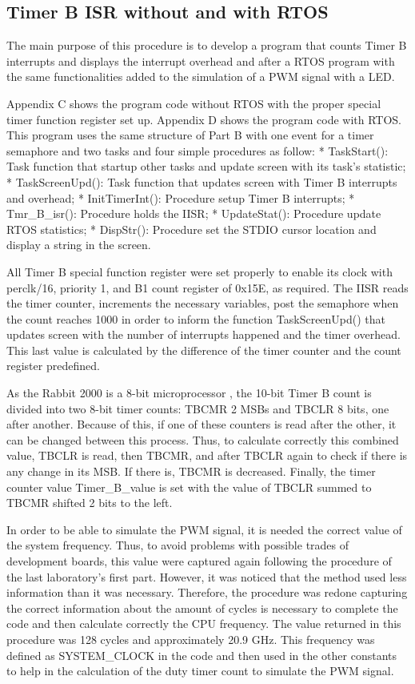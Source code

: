 \subsection{Timer B ISR without and with RTOS}

The main purpose of this procedure is to develop a program that counts Timer B interrupts and displays the interrupt overhead and after a RTOS program with the same functionalities added to the simulation of a PWM signal with a LED.

Appendix C shows the program code without RTOS with the proper special timer function register set up. Appendix D shows the program code with RTOS. This program uses the same structure of Part B with one event for a timer semaphore and two tasks and four simple procedures as follow:
* TaskStart(): Task function that startup other tasks and update screen with its task's statistic;
* TaskScreenUpd(): Task function that updates screen with Timer B interrupts and overhead;
* InitTimerInt(): Procedure setup Timer B interrupts;
* Tmr_B_isr(): Procedure holds the IISR;
* UpdateStat(): Procedure update RTOS statistics;
* DispStr(): Procedure set the STDIO cursor location and display a string in the screen.

All Timer B special function register were set properly to enable its clock with perclk/16, priority 1, and B1 count register of 0x15E, as required. The IISR reads the timer counter, increments the necessary variables, post the semaphore when the count reaches 1000 in order to inform the function TaskScreenUpd() that updates screen with the number of interrupts happened and the timer overhead. This last value is calculated by the difference of the timer counter and the count register predefined.

As the Rabbit 2000 is a 8-bit microprocessor \cite{Digi_International_2007}, the 10-bit Timer B count is divided into two 8-bit timer counts: TBCMR 2 MSBs and TBCLR 8 bits, one after another. Because of this, if one of these counters is read after the other, it can be changed between this process. Thus, to calculate correctly this combined value, TBCLR is read, then TBCMR, and after TBCLR again to check if there is any change in its MSB. If there is, TBCMR is decreased. Finally, the timer counter value Timer_B_value is set with the value of TBCLR summed to TBCMR shifted 2 bits to the left. 

In order to be able to simulate the PWM signal, it is needed the correct value of the system frequency. Thus, to avoid problems with possible trades of development boards, this value were captured again following the procedure of the last laboratory's first part. However, it was noticed that the method used less information than it was necessary. Therefore, the procedure was redone capturing the correct information about the amount of cycles is necessary to complete the code and then calculate correctly the CPU frequency. The value returned in this procedure was 128 cycles and approximately 20.9 GHz. This frequency was defined as SYSTEM_CLOCK in the code and then used in the other constants to help in the calculation of the duty timer count to simulate the PWM signal.
